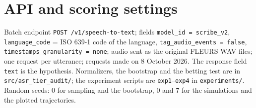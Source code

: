 


\appendix
\section{API and scoring settings}
\label{app:settings}

Batch endpoint \texttt{POST /v1/speech-to-text}; fields \texttt{model\_id = scribe\_v2}, \texttt{language\_code} = ISO 639-1 code of the language, \texttt{tag\_audio\_events = false}, \texttt{timestamps\_granularity = none}; audio sent as the original FLEURS WAV files; one request per utterance; requests made on 8 October 2026. The response field \texttt{text} is the hypothesis. Normalizers, the bootstrap and the betting test are in \texttt{src/asr\_tier\_audit/}; the experiment scripts are \texttt{exp1}--\texttt{exp4} in \texttt{experiments/}. Random seeds: 0 for sampling and the bootstrap, 0 and 7 for the simulations and the plotted trajectories.


